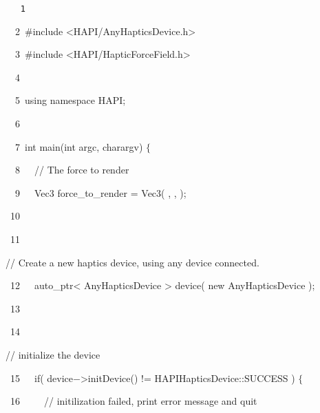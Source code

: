 {
\tt
{\hlstd }{\hlline \ \ \ \ 1\ }\leavevmode\par
{\hlline \ \ \ \ 2\ }{\hldir \#include $\mathord{<}$HAPI/AnyHapticsDevice.h$\mathord{>}$}\leavevmode\par
{\hlline \ \ \ \ 3\ }{\hlstd }{\hldir \#include $\mathord{<}$HAPI/HapticForceField.h$\mathord{>}$}\leavevmode\par
{\hlline \ \ \ \ 4\ }{\hlstd }\leavevmode\par
{\hlline \ \ \ \ 5\ }{\hlkwa using namespace }{\hlstd HAPI}{\hlsym ;}\leavevmode\par
{\hlline \ \ \ \ 6\ }{\hlstd }\leavevmode\par
{\hlline \ \ \ \ 7\ }{\hlkwb int }{\hlstd }{\hlkwd main}{\hlstd }{\hlsym (}{\hlstd }{\hlkwb int }{\hlstd argc}{\hlsym , }{\hlstd }{\hlkwb char}{\hlstd }{\hlsym * }{\hlstd argv}{\hlsym []) $\{$}\leavevmode\par
{\hlline \ \ \ \ 8\ }{\hlstd }{\hlstd\ \ }{\hlstd }{\hlslc // The force to render}\leavevmode\par
{\hlline \ \ \ \ 9\ }{\hlstd }{\hlstd\ \ }{\hlstd Vec3 force\_{}to\_{}render }{\hlsym $\mathord{=}$ }{\hlstd }{\hlkwd Vec3}{\hlstd }{\hlsym ( }{\hlstd }{}{\hlstd }{\hlsym , }{\hlstd }{}{\hlstd }{\hlsym , }{\hlstd }{ }{\hlstd }{\hlsym );}\leavevmode\par
{\hlline \ \ \ 10\ }{\hlstd \leavevmode\par
{\hlline \ \ \ 11\ }}{\hlstd\ \ }{\hlstd }{\hlslc // Create a new haptics device, using any device connected.}\leavevmode\par
{\hlline \ \ \ 12\ }{\hlstd }{\hlstd\ \ }{\hlstd auto\_{}ptr}{\hlsym $\mathord{<}$ }{\hlstd AnyHapticsDevice }{\hlsym $\mathord{>}$ }{\hlstd }{\hlkwd device}{\hlstd }{\hlsym ( }{\hlstd }{\hlkwa new }{\hlstd AnyHapticsDevice }{\hlsym );}\leavevmode\par
{\hlline \ \ \ 13\ }{\hlstd \leavevmode\par
{\hlline \ \ \ 14\ }}{\hlstd\ \ }{\hlstd }{\hlslc // initialize the device}\leavevmode\par
{\hlline \ \ \ 15\ }{\hlstd }{\hlstd\ \ }{\hlstd }{\hlkwa if}{\hlstd }{\hlsym ( }{\hlstd device}{\hlsym $\mathord{-}$$\mathord{>}$}{\hlstd }{\hlkwd initDevice}{\hlstd }{\hlsym () !$\mathord{=}$ }{\hlstd HAPIHapticsDevice}{\hlsym ::}{\hlstd SUCCESS }{\hlsym ) $\{$}\leavevmode\par
{\hlline \ \ \ 16\ }{\hlstd }{\hlstd\ \ \ \ }{\hlstd }{\hlslc // initilization failed, print error message and quit}\leavevmode\par
}
